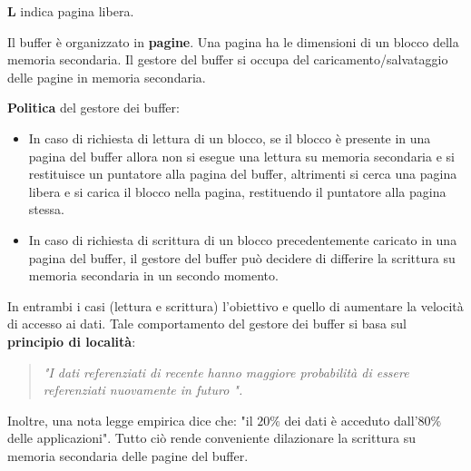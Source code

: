 \documentclass[a4paper, 10pt]{article}
\theoremstyle{definition}
\begin{document}
		\textbf{L} indica pagina libera.
		
		Il buffer è organizzato in \textbf{pagine}. Una pagina ha le dimensioni di un blocco della memoria secondaria.
		Il gestore del buffer si occupa del caricamento/salvataggio delle pagine in memoria secondaria.
		
		\textbf{Politica} del gestore dei buffer:
		\begin{itemize}
			\item In caso di richiesta di lettura di un blocco, se il blocco è presente in una pagina del buffer allora non si esegue una lettura su memoria secondaria e si restituisce un puntatore alla
			pagina del buffer, altrimenti si cerca una pagina libera e si carica il blocco nella pagina, restituendo il puntatore alla pagina stessa.
			\item In caso di richiesta di scrittura di un blocco precedentemente
			caricato in una pagina del buffer, il gestore del buffer può
			decidere di differire la scrittura su memoria secondaria in un
			secondo momento.
		\end{itemize}
		
		In entrambi i casi (lettura e scrittura) l'obiettivo e quello di
		aumentare la velocità di accesso ai dati.
		Tale comportamento del gestore dei buffer si basa sul \textbf{principio di
		località}: 
		\begin{quotation}
			\textit{"I dati referenziati di recente hanno maggiore probabilità di
			essere referenziati nuovamente in futuro ".}
		\end{quotation}	
		Inoltre, una nota legge	empirica dice che: "il $20\%$ dei dati è acceduto dall'$80\%$ delle applicazioni".
		Tutto ciò rende conveniente dilazionare la scrittura su memoria
		secondaria delle pagine del buffer.
		
\end{document}
